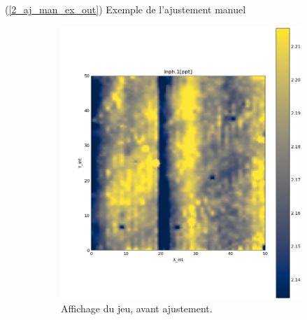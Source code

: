 \documentclass[12pt]{article}
\begin{document}
    \label{2_aj_man_ex_in} (\ref{2_aj_man_ex_out}) Exemple de l'ajustement manuel
    
    \begin{figure}[ht!]
        \begin{subfigure}[b]{0.475\textwidth}
            \centering
            \includegraphics[width=\textwidth]{Images/Base_man_grid_Avant_sq1.png}
            \caption[]%
            {{ \small Affichage du jeu, avant ajustement.}}
        \end{subfigure}
        \hfill
        \begin{subfigure}[b]{0.475\textwidth}  
            \centering 

\end{subfigure}
\end{figure}
\end{document}

